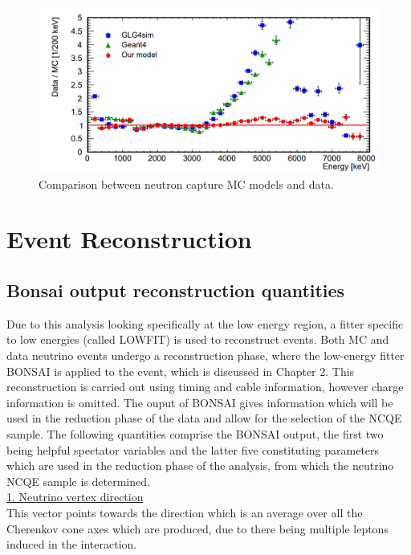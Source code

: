 \begin{figure}
\includegraphics[width=\textwidth]{Figures/annrigdmodelcompare.png}
\caption{Comparison between neutron capture MC models and data.}
\label{fig:annrigdmodelcompare}
\end{figure}


\section{Event Reconstruction}
\subsection{Bonsai output reconstruction quantities}

Due to this analysis looking specifically at the low energy region, a fitter specific to low energies (called LOWFIT) is used to reconstruct events. Both MC and data neutrino events undergo a reconstruction phase, where the low-energy fitter BONSAI is applied to the event, which is discussed in Chapter 2. This reconstruction is carried out using timing and cable information, however charge information is omitted. The ouput of BONSAI gives information which will be used in the reduction phase of the data and allow for the selection of the NCQE sample. The following quantities comprise the BONSAI output, the first two being helpful spectator variables and the latter five constituting parameters which are used in the reduction phase of the analysis, from which the neutrino NCQE sample is determined.\\

\noindent
\underline{1. Neutrino vertex direction}\\
\noindent
This vector points towards the direction which is an average over all the Cherenkov cone axes which are produced, due to there being multiple leptons induced in the interaction.

